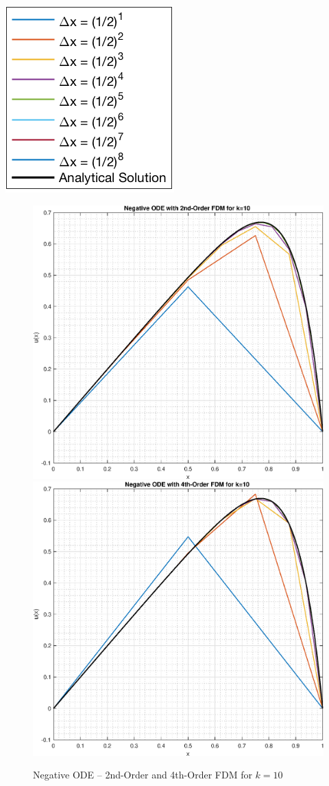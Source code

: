 \documentclass[10pt, reqno]{article}		%
\numberwithin{equation}{section}
\begin{document}
\begin{center}
	\includegraphics[height = 0.25\linewidth]{legend}
\end{center}

\newpage

\begin{figure}[H]
	\begin{center}
		\includegraphics[width = 0.49\linewidth]{negative_ode_order_2_k_10}
		\includegraphics[width = 0.49\linewidth]{negative_ode_order_4_k_10}
		\caption{Negative ODE -- 2nd-Order and 4th-Order FDM for $k = 10$}
	\end{center}
\end{figure}
\end{document}
